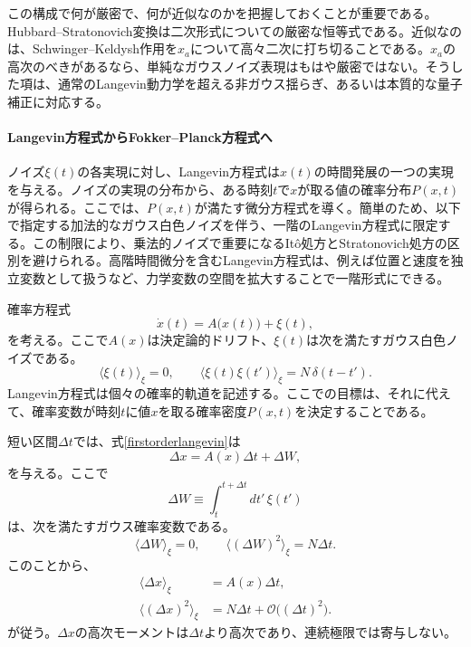 \documentclass[a4paper,11pt,oneside]{article}
\theoremstyle{definition}
\numberwithin{equation}{section}
\begin{document}
この構成で何が厳密で、何が近似なのかを把握しておくことが重要である。Hubbard--Stratonovich変換は二次形式についての厳密な恒等式である。近似なのは、Schwinger--Keldysh作用を\(x_a\)について高々二次に打ち切ることである。\(x_a\)の高次のべきがあるなら、単純なガウスノイズ表現はもはや厳密ではない。そうした項は、通常のLangevin動力学を超える非ガウス揺らぎ、あるいは本質的な量子補正に対応する。





\paragraph{Langevin方程式からFokker--Planck方程式へ} ノイズ$ \xi(t)$の各実現に対し、Langevin方程式は$ x(t)$の時間発展の一つの実現を与える。ノイズの実現の分布から、ある時刻$ t$で$ x$が取る値の確率分布$ P(x,t)$が得られる。ここでは、$ P(x,t)$が満たす微分方程式を導く。簡単のため、以下で指定する加法的なガウス白色ノイズを伴う、一階のLangevin方程式に限定する。この制限により、乗法的ノイズで重要になるIt\^o処方とStratonovich処方の区別を避けられる。高階時間微分を含むLangevin方程式は、例えば位置と速度を独立変数として扱うなど、力学変数の空間を拡大することで一階形式にできる。



確率方程式
\begin{equation}
\dot{x}(t)
=
A\bigl(x(t)\bigr)
+
\xi(t),
\label{firstorderlangevin}
\end{equation}
を考える。ここで\(A(x)\)は決定論的ドリフト、\(\xi(t)\)は次を満たすガウス白色ノイズである。
\begin{equation}
\langle \xi(t) \rangle_{\xi}
=
0,
\qquad
\langle \xi(t)\xi(t') \rangle_{\xi}
=
N\,\delta(t-t').
\label{additivewhitenoise}
\end{equation}
Langevin方程式は個々の確率的軌道を記述する。ここでの目標は、それに代えて、確率変数が時刻\(t\)に値\(x\)を取る確率密度\(P(x,t)\)を決定することである。



短い区間\(\Delta t\)では、式\eqref{firstorderlangevin}は
\begin{equation}
\Delta x
=
A(x)\Delta t
+
\Delta W,
\label{shorttimeincrement}
\end{equation}
を与える。ここで
\begin{equation}
\Delta W
\equiv
\int_{t}^{t+\Delta t}dt'\,\xi(t')
\end{equation}
は、次を満たすガウス確率変数である。
\begin{equation}
\langle \Delta W\rangle_{\xi}
=
0,
\qquad
\langle (\Delta W)^{2}\rangle_{\xi}
=
N\Delta t.
\end{equation}
このことから、
\begin{align}
\langle \Delta x\rangle_{\xi}
&=
A(x)\Delta t,
\\
\langle (\Delta x)^{2}\rangle_{\xi}
&=
N\Delta t
+
\mathcal O\bigl((\Delta t)^{2}\bigr).
\end{align}
が従う。\(\Delta x\)の高次モーメントは\(\Delta t\)より高次であり、連続極限では寄与しない。
\end{document}
